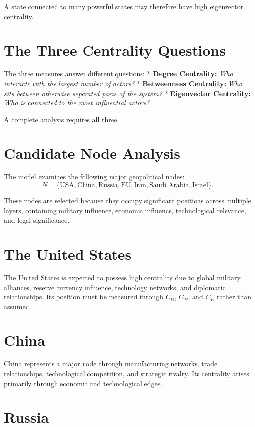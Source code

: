 \documentclass[11pt,openany]{book}
\theoremstyle{plain}
\theoremstyle{definition}
\begin{document}
A state connected to many powerful states may therefore have high eigenvector centrality.

\section*{The Three Centrality Questions}

The three measures answer different questions:
* \textbf{Degree Centrality:} \textit{Who interacts with the largest number of actors?}
* \textbf{Betweenness Centrality:} \textit{Who sits between otherwise separated parts of the system?}
* \textbf{Eigenvector Centrality:} \textit{Who is connected to the most influential actors?}

A complete analysis requires all three.

\section*{Candidate Node Analysis}

The model examines the following major geopolitical nodes:
\[
N = \{\text{USA}, \text{China}, \text{Russia}, \text{EU}, \text{Iran}, \text{Saudi Arabia}, \text{Israel}\}.
\]

These nodes are selected because they occupy significant positions across multiple layers, containing military influence, economic influence, technological relevance, and legal significance.

\section*{The United States}

The United States is expected to possess high centrality due to global military alliances, reserve currency influence, technology networks, and diplomatic relationships. Its position must be measured through \(C_D\), \(C_B\), and \(C_E\) rather than assumed.

\section*{China}

China represents a major node through manufacturing networks, trade relationships, technological competition, and strategic rivalry. Its centrality arises primarily through economic and technological edges.

\section*{Russia}
\end{document}
